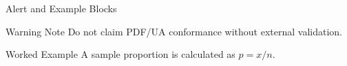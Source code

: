 \documentclass[14pt,t]{beamer}
\begin{document}
\begin{frame}{Alert and Example Blocks}
\begin{alertblock}{Warning Note}
Do not claim PDF/UA conformance without external validation.
\end{alertblock}

\begin{exampleblock}{Worked Example}
A sample proportion is calculated as $p = x / n$.
\end{exampleblock}
\end{frame}
\end{document}
